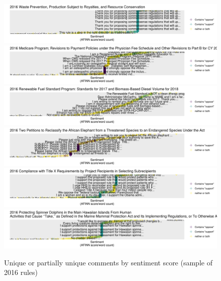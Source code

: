 \documentclass{article}
\begin{document}
\begin{figure}
    \caption{Unique or partially unique comments by sentiment score (sample of 2016 rules)}
    \label{fig:sentiment-2016}
    \centering
    \includegraphics[width = 7in]{Figs/sent-2016BLM-2016-0001.png}
    \includegraphics[width = 7in]{Figs/sent-2016CMS-2016-0116.png}
    \includegraphics[width = 7in]{Figs/sent-2016EPA-HQ-OAR-2016-0004.png}
    \includegraphics[width = 7in]{Figs/sent-2016FWS-HQ-ES-2016-0010.png}
    \includegraphics[width = 7in]{Figs/sent-2016HHS-OS-2016-0014.png}
    \includegraphics[width = 7in]{Figs/sent-2016NOAA-2005-0226.png}
\end{figure}


\clearpage 

\singlespace
\small
 

\end{document}

